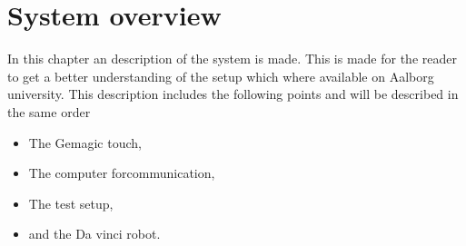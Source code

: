 \chapter{System overview}\label{cha:overview}

In this chapter an description of the system is made. This is made for the reader to get a better understanding of the setup which where available on Aalborg university. This description includes the following points and will be described in the same order

\begin{itemize}
  \item The Gemagic touch,
  \item The computer forcommunication,
  \item The test setup,
  \item and the Da vinci robot.
\end{itemize}











